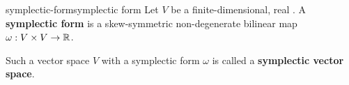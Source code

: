 \begin{topic}{symplectic-form}{symplectic form}
    Let $V$ be a finite-dimensional, real . A \textbf{symplectic form} is a skew-symmetric non-degenerate bilinear map $\omega : V \times V \to \mathbb{R}$.
    
    Such a vector space $V$ with a symplectic form $\omega$ is called a \textbf{symplectic vector space}.
\end{topic}

